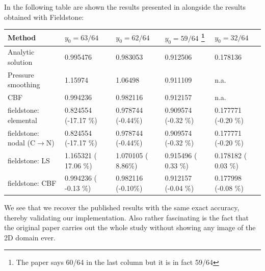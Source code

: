 In the following table are shown the results presented in \cite{zhgh93} alongside the results obtained with Fieldstone:
\begin{center}
\begin{tabular}{l||llll}
\hline
Method             & $y_0=63/64$ & $y_0=62/64$ &  $y_0=59/64$
\footnote{The paper says 60/64 in the last column but it is in fact 59/64}
 & $y_0=32/64$\\ 
\hline
\hline
Analytic solution                   & 0.995476 & 0.983053  &  0.912506 & 0.178136 \\
Pressure smoothing \cite{zhgh93}    & 1.15974  & 1.06498   &  0.911109 & n.a. \\
CBF                \cite{zhgh93}    & 0.994236 & 0.982116  &  0.912157 & n.a. \\
\hline
\hline
fieldstone: elemental               & 0.824554 (-17.17 \%) & 0.978744 (-0.44\%) & 0.909574 (-0.32 \%) & 0.177771 (-0.20 \%)\\
fieldstone: nodal (C$\rightarrow$N) & 0.824554 (-17.17 \%) & 0.978744 (-0.44\%) & 0.909574 (-0.32 \%) & 0.177771 (-0.20 \%)\\
fieldstone: LS                      & 1.165321 ( 17.06 \%) & 1.070105 ( 8.86\%) & 0.915496 ( 0.33 \%) & 0.178182 ( 0.03 \%)\\
fieldstone: CBF                     & 0.994236 ( -0.13 \%) & 0.982116 (-0.10\%) & 0.912157 (-0.04 \%) & 0.177998 (-0.08 \%)\\
\hline
\end{tabular}
\end{center}
We see that we recover the published results with the same exact accuracy, thereby validating our implementation. Also rather fascinating is the fact that the original paper carries out the whole study without showing any image of the 2D domain ever. 

